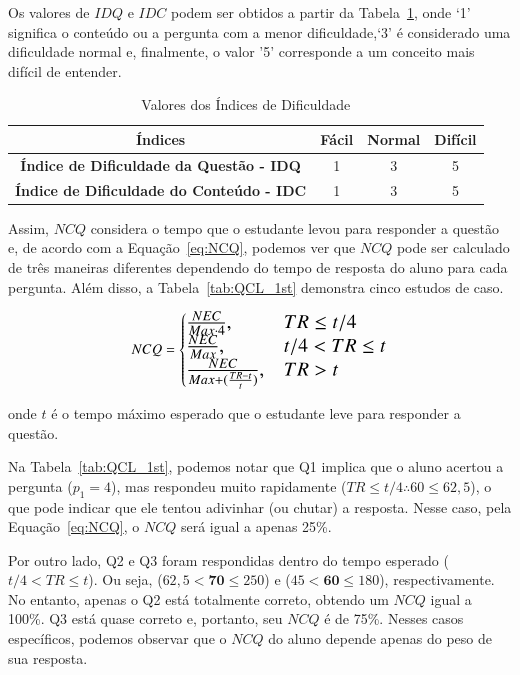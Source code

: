 Os valores de $IDQ$ e $IDC$ podem ser obtidos a partir da Tabela~\ref{tab:DVI}, onde `1' significa o conteúdo ou a pergunta com a menor dificuldade,`3' é considerado uma dificuldade normal e, finalmente, o valor '5' corresponde a um conceito mais difícil de entender.

\begin{table}[htbp]
\caption{Valores dos Índices de Dificuldade}
\begin{center}
\begin{tabular}{|c|c|c|c|}
\hline
\textbf{Índices} & \textbf{Fácil} & \textbf{Normal} & \textbf{Difícil}  \\ \hline
\textbf{Índice de Dificuldade da Questão - IDQ} & 1 & 3 & 5\\ \hline
\textbf{Índice de Dificuldade do Conteúdo - IDC} & 1 & 3 & 5\\ \hline
\end{tabular}
\end{center}
\label{tab:DVI}
\end{table}

Assim, $NCQ$ considera o tempo que o estudante levou para responder a questão e, de acordo com a Equação~\ref{eq:NCQ}, podemos ver que $NCQ$ pode ser calculado de três maneiras diferentes dependendo do tempo de resposta do aluno para cada pergunta. Além disso, a Tabela~\ref{tab:QCL_1st} demonstra cinco estudos de caso.

\begin{equation}
\fontsize{14}{14}\selectfont
\label{eq:NCQ}
NCQ = 
\begin{cases}
\frac{NEC}{Max\cdot 4}, & TR \leq t/4 \\
\frac{NEC}{Max}, & t/4 < TR \leq t\\
\frac{NEC}{Max + (\frac{TR - t}{t})}, & TR > t
\end{cases}
\end{equation}

onde $t$ é o tempo máximo esperado que o estudante leve para responder a questão.

Na Tabela~\ref{tab:QCL_1st}, podemos notar que Q1 implica que o aluno acertou a pergunta ($p_1 = 4$), mas respondeu muito rapidamente ($TR \leq t/4 \therefore 60 \leq 62,5$), o que pode indicar que ele tentou adivinhar (ou chutar) a resposta. Nesse caso, pela Equação~\ref{eq:NCQ}, o $NCQ$ será igual a apenas 25\%.

Por outro lado, Q2 e Q3 foram respondidas dentro do tempo esperado ($t/4 < TR \leq t$). Ou seja, ($62,5 <\textbf{70} \leq 250$) e ($45 < \textbf{60} \leq 180$), respectivamente.
No entanto, apenas o Q2 está totalmente correto, obtendo um $NCQ$ igual a 100\%. Q3 está quase correto e, portanto, seu $NCQ$ é de 75\%. Nesses casos específicos, podemos observar que o $NCQ$ do aluno depende apenas do peso de sua resposta.

